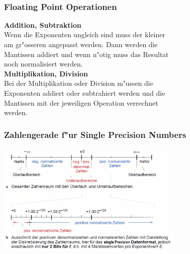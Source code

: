 %
\begin{minipage}{0.5cm}
	\ \
\end{minipage}
%
\begin{minipage}[t]{9cm}
			
	\subsubsection{Floating Point Operationen}
		\begin{tabbing}
			\textbf{Add}\=\textbf{ition, Subtraktion}\\
			\> Wenn die Exponenten ungleich sind muss der kleiner\\ 
			\> am gr"osseren angepasst werden. Dann werden die\\ 
			\> Mantissen addiert und wenn n"otig muss das Resultat\\ 
			\> noch normalisiert werden.\\
	
			\textbf{Multiplikation, Division}\\
			\> Bei der Multiplikation oder Division m"ussen die\\
			\> Exponenten addiert oder subtrahiert werden und die\\ 
			\> Mantissen mit der jeweiligen Operation verrechnet\\ 
			\> werden.
		\end{tabbing}

	\subsubsection{Zahlengerade f"ur Single Precision Numbers}
		\includegraphics[width=9cm]{pics/IEEE-Zahlengerade}

\end{minipage}


